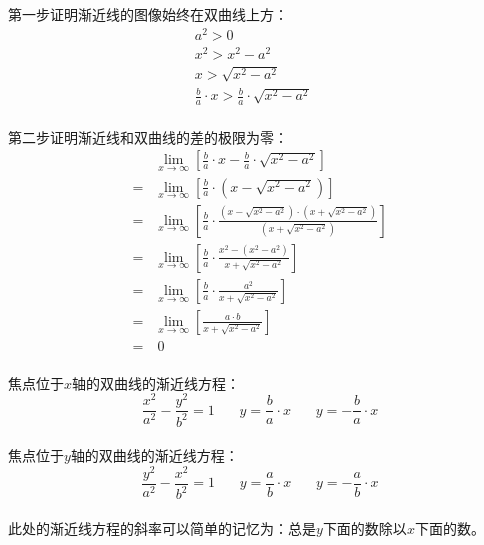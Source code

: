 \documentclass[UTF8]{ctexart}
\begin{document}
\newpage

    第一步证明渐近线的图像始终在双曲线上方：\vspace{3pt}
    \begin{align}
        &a^2>0\\[5mm]
        &x^2>x^2-a^2\\[5mm]
        &x>\sqrt{x^2-a^2}\\[5mm]
        &\frac{b}{a}\cdot x>\frac{b}{a}\cdot\sqrt{x^2-a^2}~~~~~~~~
    \end{align}\\
    第二步证明渐近线和双曲线的差的极限为零：\vspace{8pt}
    \begin{align}
        &\lim_{x\rightarrow \infty}\left[\frac{b}{a}\cdot x-\frac{b}{a}\cdot \sqrt{x^2-a^2}\right]\\[4mm]
        =&\lim_{x\rightarrow \infty}\left[\frac{b}{a}\cdot\left(x-\sqrt{x^2-a^2}\right)\right]\\[4mm]
        =&\lim_{x\rightarrow \infty}\left[\frac{b}{a}\cdot\frac{\left(x-\sqrt{x^2-a^2}\right)\cdot\left(x+\sqrt{x^2-a^2}\right)}{\left(x+\sqrt{x^2-a^2}\right)}\right]\\[4mm]
        =&\lim_{x\rightarrow \infty}\left[\frac{b}{a}\cdot\frac{x^2-\left(x^2-a^2\right)}{x+\sqrt{x^2-a^2}}\right]\\[4mm]
        =&\lim_{x\rightarrow \infty}\left[\frac{b}{a}\cdot\frac{a^2}{x+\sqrt{x^2-a^2}}\right]\\[4mm]
        =&\lim_{x\rightarrow \infty}\left[\frac{a\cdot b}{x+\sqrt{x^2-a^2}}\right]\\[4mm]
        =&~0
    \end{align}\\
    焦点位于$x$轴的双曲线的渐近线方程：
    \begin{equation*}
        \frac{x^2}{a^2}-\frac{y^2}{b^2}=1~~~~~~~~y=\frac{b}{a}\cdot x~~~~~~~~y=-\frac{b}{a}\cdot x
    \end{equation*}\\
    焦点位于$y$轴的双曲线的渐近线方程：
    \begin{equation*}
        \frac{y^2}{a^2}-\frac{x^2}{b^2}=1~~~~~~~~y=\frac{a}{b}\cdot x~~~~~~~~y=-\frac{a}{b}\cdot x
    \end{equation*}\\
    此处的渐近线方程的斜率可以简单的记忆为：总是$y$下面的数除以$x$下面的数。

\newpage
\end{document}
